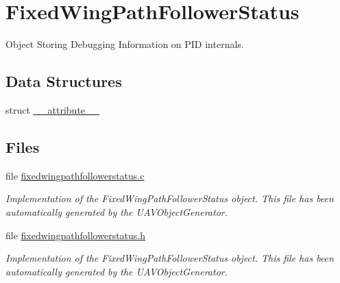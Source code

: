 \hypertarget{group___fixed_wing_path_follower_status}{\section{\-Fixed\-Wing\-Path\-Follower\-Status}
\label{group___fixed_wing_path_follower_status}
}


\-Object \-Storing \-Debugging \-Information on \-P\-I\-D internals.  


\subsection*{\-Data \-Structures}
\begin{DoxyCompactItemize}
\item 
struct \hyperlink{struct____attribute____}{\-\_\-\-\_\-attribute\-\_\-\-\_\-}
\end{DoxyCompactItemize}
\subsection*{\-Files}
\begin{DoxyCompactItemize}
\item 
file \hyperlink{fixedwingpathfollowerstatus_8c}{fixedwingpathfollowerstatus.\-c}
\begin{DoxyCompactList}\small\item\em \-Implementation of the \-Fixed\-Wing\-Path\-Follower\-Status object. \-This file has been automatically generated by the \-U\-A\-V\-Object\-Generator. \end{DoxyCompactList}\item 
file \hyperlink{fixedwingpathfollowerstatus_8h}{fixedwingpathfollowerstatus.\-h}
\begin{DoxyCompactList}\small\item\em \-Implementation of the \-Fixed\-Wing\-Path\-Follower\-Status object. \-This file has been automatically generated by the \-U\-A\-V\-Object\-Generator. \end{DoxyCompactList}\end{DoxyCompactItemize}

